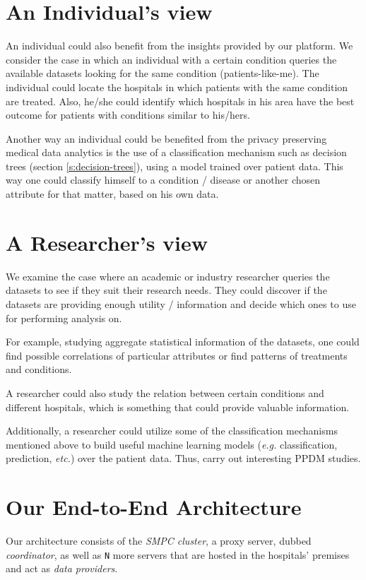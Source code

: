 \section{An Individual's view}
An individual could also benefit from the insights provided by our platform.
We consider the case in which an individual with a certain condition queries the available datasets looking for the same condition (patients\hyp like\hyp me).
The individual could locate the hospitals in which patients with the same condition are treated.
Also, he/she could identify which hospitals in his area have the best outcome for patients with conditions similar to his/hers.

Another way an individual could be benefited from the privacy preserving medical data analytics is the use of a classification mechanism such as decision trees (section \ref{s:decision-trees}), using a model trained over patient data.
This way one could classify himself to a condition / disease or another chosen attribute for that matter, based on his own data.


\section{A Researcher's view}
We examine the case where an academic or industry researcher queries the datasets to see if they suit their research needs.
They could discover if the datasets are providing enough utility / information and decide which ones to use for performing analysis on.

For example, studying aggregate statistical information of the datasets, one could find possible correlations of particular attributes or find patterns of treatments and conditions.

A researcher could also study the relation between certain conditions and different hospitals, which is something that could provide valuable information.

Additionally, a researcher could utilize some of the classification mechanisms mentioned above to build useful machine learning models (\textit{e.g.} classification, prediction, \textit{etc.}) over the patient data.
Thus, carry out interesting PPDM studies.



\section{Our End-to-End Architecture}\label{s:architecture}
Our architecture consists of the \textit{SMPC cluster}, a proxy server, dubbed \textit{coordinator}, as well as \texttt{N} more servers that are hosted in the hospitals' premises and act as \textit{data providers}.

